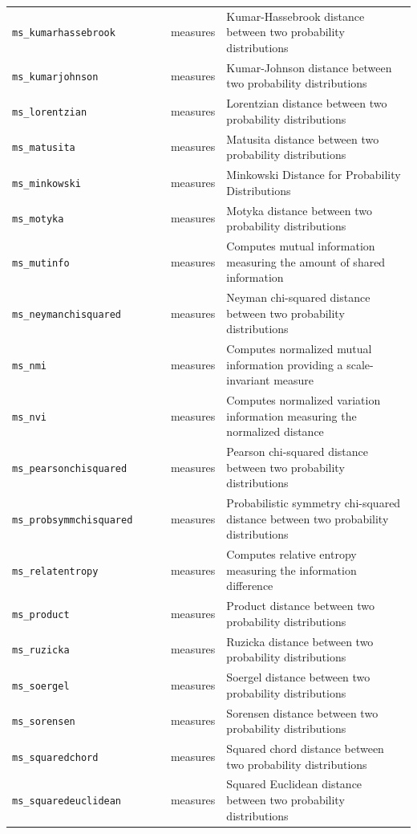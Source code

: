 \begin{footnotesize}
\begin{longtable}{|p{0.4\linewidth}|p{0.1\linewidth}|p{0.5\linewidth}|}
\texttt{ms\_kumarhassebrook} & measures & Kumar-Hassebrook distance between two probability distributions\\
\texttt{ms\_kumarjohnson} & measures & Kumar-Johnson distance between two probability distributions\\
\texttt{ms\_lorentzian} & measures & Lorentzian distance between two probability distributions\\
\texttt{ms\_matusita} & measures & Matusita distance between two probability distributions\\
\texttt{ms\_minkowski} & measures & Minkowski Distance for Probability Distributions\\
\texttt{ms\_motyka} & measures & Motyka distance between two probability distributions\\
\texttt{ms\_mutinfo} & measures & Computes mutual information measuring the amount of shared information\\
\texttt{ms\_neymanchisquared} & measures & Neyman chi-squared distance between two probability distributions\\
\texttt{ms\_nmi} & measures & Computes normalized mutual information providing a scale-invariant measure\\
\texttt{ms\_nvi} & measures & Computes normalized variation information measuring the normalized distance\\
\texttt{ms\_pearsonchisquared} & measures & Pearson chi-squared distance between two probability distributions\\
\texttt{ms\_probsymmchisquared} & measures & Probabilistic symmetry chi-squared distance between two probability distributions\\
\texttt{ms\_relatentropy} & measures & Computes relative entropy measuring the information difference\\
\texttt{ms\_product} & measures & Product distance between two probability distributions\\
\texttt{ms\_ruzicka} & measures & Ruzicka distance between two probability distributions\\
\texttt{ms\_soergel} & measures & Soergel distance between two probability distributions\\
\texttt{ms\_sorensen} & measures & Sorensen distance between two probability distributions\\
\texttt{ms\_squaredchord} & measures & Squared chord distance between two probability distributions\\
\texttt{ms\_squaredeuclidean} & measures & Squared Euclidean distance between two probability distributions\\

\end{longtable}
\end{footnotesize}
